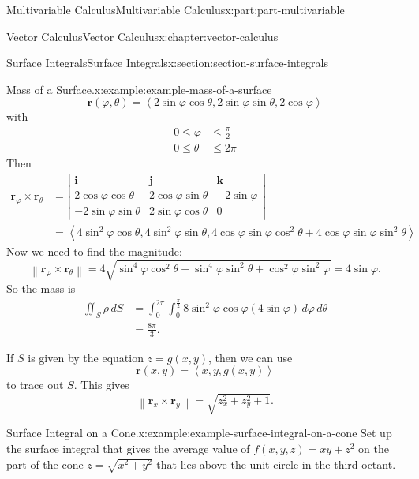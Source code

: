 \documentclass[twoside,10pt,]{tufte-book}
\numberwithin{equation}{part}
\newcommand{\vb}[1]{\mathbf{#1}}
\newcommand{\norm}[1]{\left\| #1 \right\|}
\newcommand{\dotprod}[1]{\left\langle #1 \right\rangle}
\newcommand{\amp}{&}
\begin{document}
\begin{partptx}{Multivariable Calculus}{}{Multivariable Calculus}{}{}{x:part:part-multivariable}
\begin{chapterptx}{Vector Calculus}{}{Vector Calculus}{}{}{x:chapter:vector-calculus}
\begin{sectionptx}{Surface Integrals}{}{Surface Integrals}{}{}{x:section:section-surface-integrals}
\begin{example}{Mass of a Surface.}{x:example:example-mass-of-a-surface}
\begin{equation*}
\vb{r}(\varphi,\theta) = \dotprod{2\sin\varphi\cos\theta, 2\sin\varphi\sin\theta, 2\cos\varphi}
\end{equation*}
with%
\begin{align*}
0\leq \varphi \amp \leq \frac{\pi}{2} \\
0\leq \theta \amp \leq 2\pi 
\end{align*}
Then%
\begin{align*}
\vb{r}_{\varphi}\times\vb{r}_{\theta} \amp= \left|\begin{array}{ccc} \vb{i} \amp \vb{j} \amp \vb{k} \\ 2\cos\varphi\cos\theta \amp 2\cos\varphi\sin\theta \amp -2\sin\varphi \\ -2\sin\varphi\sin\theta \amp 2\sin\varphi\cos\theta \amp 0\end{array}\right|\\
\amp= \dotprod{4\sin^{2}\varphi\cos\theta, 4\sin^{2}\varphi\sin\theta, 4\cos\varphi\sin\varphi\cos^{2}\theta + 4\cos\varphi\sin\varphi\sin^{2}\theta}
\end{align*}
Now we need to find the magnitude:%
\begin{equation*}
\norm{\vb{r}_{\varphi}\times\vb{r}_{\theta}} = 4\sqrt{\sin^{4}\varphi\cos^{2}\theta + \sin^{4}\varphi\sin^{2}\theta + \cos^{2}\varphi\sin^{2}\varphi} = 4\sin\varphi\text{.}
\end{equation*}
So the mass is%
\begin{align*}
\iint_{S}\rho\,dS \amp = \int_{0}^{2\pi}\int_{0}^{\frac{\pi}{2}}8\sin^{2}\varphi\cos\varphi(4\sin\varphi)\,d\varphi\,d\theta\\
\amp = \frac{8\pi}{3} \text{.}
\end{align*}
%
\end{example}
If \(S\) is given by the equation \(z = g(x,y)\), then we can use%
\begin{equation*}
\vb{r}(x,y) = \dotprod{x, y, g(x,y)}
\end{equation*}
to trace out \(S\). This gives%
\begin{equation*}
\norm{\vb{r}_{x}\times\vb{r}_{y}} = \sqrt{z_{x}^{2} + z_{y}^{2} + 1}\text{.}
\end{equation*}
%
\begin{example}{Surface Integral on a Cone.}{x:example:example-surface-integral-on-a-cone}%
Set up the surface integral that gives the average value of \(f(x,y,z) = xy + z^{2}\) on the part of the cone \(z = \sqrt{x^{2} + y^{2}}\) that lies above the unit circle in the third octant.%

\end{example}
\end{sectionptx}
\end{chapterptx}
\end{partptx}
\end{document}
